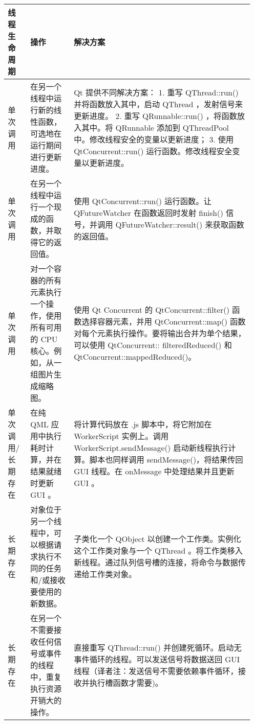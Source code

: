 \begin{longtable}[l]{|l|m{10em}|m{15em}|}
\hline
线程生命周期 	& 操作 	 & 解决方案   \\ 
\hline
单次调用 	& 在另一个线程中运行新的线性函数，可选地在运行期间进行更新进度。 &	Qt 提供不同解决方案：
1. 重写 QThread::run() 并将函数放入其中，启动 QThread ，发射信号来更新进度。
2. 重写 QRunnable::run() ，将函数放入其中。将 QRunnable 添加到 QThreadPool 中。修改线程安全的变量以更新进度；
3. 使用 QtConcurrent::run() 运行函数。修改线程安全变量以更新进度。\\ 
\hline
单次调用 &	在另一个线程中运行一个现成的函数，并取得它的返回值。 	& 使用 QtConcurrent::run() 运行函数。让 QFutureWatcher 在函数返回时发射 finish() 信号，并调用 QFutureWatcher::result() 来获取函数的返回值。 \\ 
\hline
单次调用 &	对一个容器的所有元素执行一个操作，使用所有可用的 CPU 核心。例如，从一组图片生成缩略图。 &	使用 Qt Concurrent 的 QtConcurrent::filter() 函数选择容器元素，并用 QtConcurrent::map() 函数对每个元素执行操作。要将输出合并为单个结果，可以使用 QtConcurrent:: filteredReduced() 和 QtConcurrent::mappedReduced()。 \\ 
\hline
单次调用/长期存在 &	在纯 QML 应用中执行耗时计算，并在结果就绪时更新 GUI 。 &	将计算代码放在 .js 脚本中，将它附加在 WorkerScript 实例上。调用 WorkerScript.sendMessage() 启动新线程执行计算。脚本也同样调用 sendMessage()，将结果传回 GUI 线程。在 onMessage 中处理结果并且更新 GUI 。 \\ 
\hline
长期存在 & 对象位于另一个线程中，可以根据请求执行不同的任务和/或接收要使用的新数据。 &	子类化一个 QObject 以创建一个工作类。实例化这个工作类对象与一个 QThread 。将工作类移入新线程。通过队列信号槽的连接，将命令与数据传递给工作类对象。 \\ 
\hline
长期存在 &	在另一个不需要接收任何信号或事件的线程中，重复执行资源开销大的操作。 & 	直接重写 QThread::run() 并创建死循环。启动无事件循环的线程。可以发送信号将数据送回 GUI 线程（译者注：发送信号不需要依赖事件循环，接收并执行槽函数才需要)。 \\
\hline
\end{longtable}